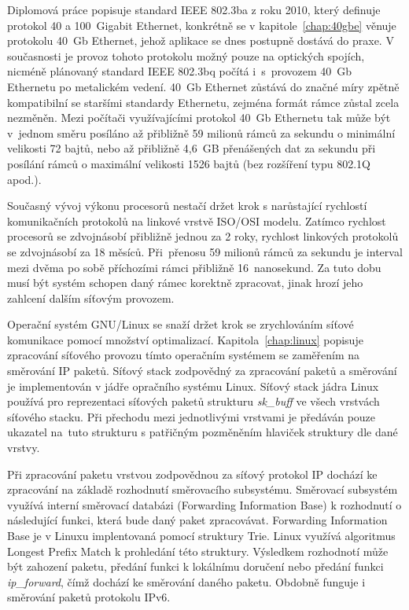 \documentclass[english,print]{fitthesis} %
\begin{document}
  \maketitle

Diplomová práce popisuje standard IEEE 802.3ba z roku 2010, který definuje protokol 40 a 100~Gigabit Ethernet,
konkrétně se v kapitole~\ref{chap:40gbe} věnuje protokolu 40~Gb Ethernet, jehož aplikace se dnes postupně dostává do praxe.
V současnosti je provoz tohoto protokolu možný pouze na optických spojích, nicméně plánovaný standard IEEE 802.3bq
počítá i~s~provozem 40~Gb Ethernetu po metalickém vedení.
40~Gb Ethernet zůstává do značné míry zpětně kompatibilní se staršími standardy Ethernetu, zejména
formát rámce zůstal zcela nezměněn.
Mezi počítači využívajícími protokol 40~Gb Ethernetu tak může být v~jednom směru posíláno
až přibližně 59 milionů rámců za sekundu o minimální velikosti 72 bajtů,
nebo až přibližně 4,6~GB přenášených dat za sekundu při posílání rámců o maximální velikosti 1526 bajtů (bez rozšíření typu 802.1Q apod.).

Současný vývoj výkonu procesorů nestačí držet krok s narůstající
rychlostí komunikačních protokolů na linkové vrstvě ISO/OSI modelu.
Zatímco rychlost procesorů se zdvojnásobí přibližně jednou za 2 roky, rychlost linkových protokolů se zdvojnásobí za 18 měsíců.
Při~přenosu 59 milionů rámců za sekundu je interval mezi dvěma po sobě příchozími rámci přibližně 16~nanosekund.
Za tuto dobu musí být systém schopen daný rámec korektně zpracovat, jinak hrozí jeho zahlcení dalším síťovým provozem.

Operační systém GNU/Linux se snaží držet krok se zrychlováním síťové komunikace pomocí množství optimalizací.
Kapitola~\ref{chap:linux} popisuje zpracování síťového provozu tímto operačním systémem se zaměřením na směrování IP paketů.
Síťový stack zodpovědný za zpracování paketů a směrování je implementován v jádře opračního systému Linux.
Síťový stack jádra Linux používá pro reprezentaci síťových paketů
strukturu {\it{sk\_buff}} ve všech vrstvách síťového stacku.
Při přechodu mezi jednotlivými vrstvami je předáván pouze ukazatel na~tuto strukturu
s patřičným pozměněním hlaviček struktury dle dané vrstvy.

Při zpracování paketu vrstvou zodpovědnou za síťový protokol IP dochází ke zpracování na základě rozhodnutí směrovacího subsystému.
Směrovací subsystém využívá interní směrovací databázi (Forwarding Information Base) k rozhodnutí o
následující funkci, která bude daný paket zpracovávat.
Forwarding Information Base je v Linuxu implentovaná pomocí struktury Trie.
Linux využívá algoritmus Longest Prefix Match k prohledání této struktury.
Výsledkem rozhodnotí může být zahození paketu, předání funkci k lokálnímu doručení nebo
předání funkci {\it{ip\_forward}}, čímž dochází ke směrování daného paketu.
Obdobně funguje i směrování paketů protokolu IPv6.
\end{document}
